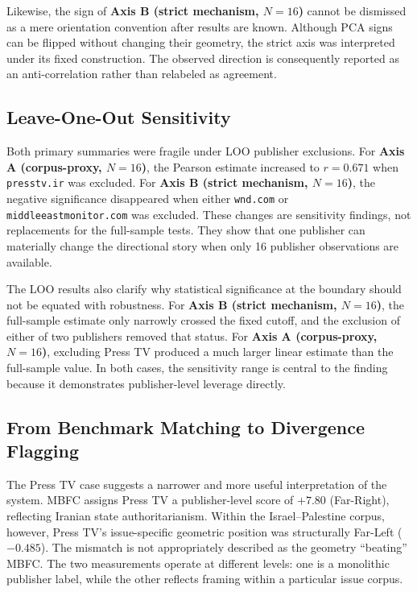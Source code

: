 Likewise, the sign of \textbf{Axis B (strict mechanism, $N=16$)} cannot be dismissed as a mere
orientation convention after results are known. Although PCA signs can be flipped without
changing their geometry, the strict axis was interpreted under its fixed construction. The
observed direction is consequently reported as an anti-correlation rather than relabeled as
agreement.

\subsection{Leave-One-Out Sensitivity}

Both primary summaries were fragile under LOO publisher exclusions. For \textbf{Axis A
(corpus-proxy, $N=16$)}, the Pearson estimate increased to $r=0.671$ when
\texttt{presstv.ir} was excluded. For \textbf{Axis B (strict mechanism, $N=16$)}, the negative
significance disappeared when either \texttt{wnd.com} or
\texttt{middleeastmonitor.com} was excluded. These changes are sensitivity findings, not
replacements for the full-sample tests. They show that one publisher can materially change the
directional story when only 16 publisher observations are available.

The LOO results also clarify why statistical significance at the boundary should not be equated
with robustness. For \textbf{Axis B (strict mechanism, $N=16$)}, the full-sample estimate only
narrowly crossed the fixed cutoff, and the exclusion of either of two publishers removed that
status. For \textbf{Axis A (corpus-proxy, $N=16$)}, excluding Press TV produced a much larger
linear estimate than the full-sample value. In both cases, the sensitivity range is central to the
finding because it demonstrates publisher-level leverage directly.

\subsection{From Benchmark Matching to Divergence Flagging}

The Press TV case suggests a narrower and more useful interpretation of the system. MBFC assigns
Press TV a publisher-level score of $+7.80$ (Far-Right), reflecting Iranian state
authoritarianism. Within the Israel--Palestine corpus, however, Press TV's issue-specific
geometric position was structurally Far-Left ($-0.485$). The mismatch is not appropriately
described as the geometry ``beating'' MBFC. The two measurements operate at different levels:
one is a monolithic publisher label, while the other reflects framing within a particular issue
corpus.

